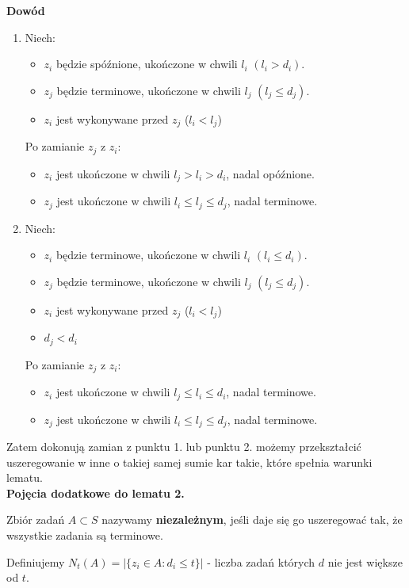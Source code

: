 \textbf{Dowód}
\begin{enumerate}
	\item{Niech: 
	\begin{itemize}
		\item $z_i$ będzie spóźnione, ukończone w chwili $l_i$ $(l_i > d_i)$.
		\item $z_j$ będzie terminowe, ukończone w chwili $l_j$ $(l_j \leq d_j)$.
		\item $z_i$ jest wykonywane przed $z_j$ ($l_i < l_j$)
	\end{itemize}
	Po zamianie $z_j$ z $z_i$:
	\begin{itemize}
		\item $z_i$ jest ukończone w chwili $l_j > l_i > d_i$, nadal opóźnione.
		\item $z_j$ jest ukończone w chwili $l_i \leq l_j \leq d_j$, nadal terminowe.
	\end{itemize}
	}
	
	\item{Niech:
	\begin{itemize}
		\item $z_i$ będzie terminowe, ukończone w chwili $l_i$ $(l_i \leq d_i)$.
		\item $z_j$ będzie terminowe, ukończone w chwili $l_j$ $(l_j \leq d_j)$.
		\item $z_i$ jest wykonywane przed $z_j$ ($l_i < l_j$)
		\item $d_j < d_i$
	\end{itemize}
	Po zamianie $z_j$ z $z_i$:
	\begin{itemize}
		\item $z_i$ jest ukończone w chwili $l_j \leq l_i \leq d_i$, nadal terminowe.
		\item $z_j$ jest ukończone w chwili $l_i \leq l_j \leq d_j$, nadal terminowe.
	\end{itemize}
	}
\end{enumerate}
Zatem dokonują zamian z punktu 1. lub punktu 2. możemy przekształcić uszeregowanie w inne o takiej samej sumie kar takie, które spełnia warunki lematu.
\\

\textbf{Pojęcia dodatkowe do lematu 2.}

Zbiór zadań $A \subset S$ nazywamy \textbf{niezależnym}, jeśli daje się go uszeregować tak, że wszystkie zadania są terminowe. 

Definiujemy $N_t(A) = |\{z_i \in A : d_i \leq t \}|$ - liczba zadań których $d$ nie jest większe od $t$. 

